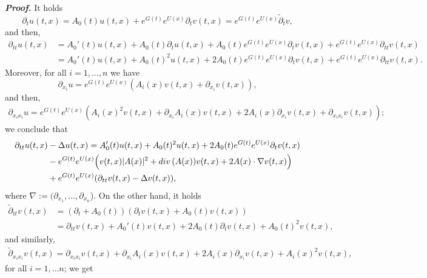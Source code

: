 \documentclass[10pt,a4paper]{amsart}
\renewcommand{\div}{\mathinner{\mathop{{\rm div}}}}
\renewenvironment{proof}{\smallskip\noindent\emph{\textbf{Proof.}}%
  \hspace{1pt}}{\hspace{-5pt}{\nobreak\quad\nobreak\hfill\nobreak%
    $\square$\vspace{2pt}\par}\smallskip\goodbreak}
\begin{document}
\begin{proof}
It holds 
%
\begin{equation*}
\partial_t u(t,x)=  A_0(t) u(t,x)+e^{G(t)} e^{U(x)} \partial_t v(t,x)=e^{G(t)} e^{U(x)} \tilde\partial_t v, 
\end{equation*}
%
and then,
\begin{align*}
\partial_{tt} u(t,x)&=  A_0'(t)u(t,x)+ A_0(t) \partial_t u(t,x)+ A_0(t)e^{G(t)} e^{U(x)} \partial_t v(t,x)+e^{G(t)} e^{U(x)}\partial_{tt}v(t,x)\\
%
&=  A_0'(t)u(t,x) +  A_0(t)^2 u(t,x)+2  A_0(t) e^{G(t)} e^{U(x)}  \partial_t v(t,x) +e^{G(t)} e^{U(x)}\partial_{tt}v(t,x).
\end{align*}
%
Moreover, for all $i=1, \dots, n$ we have
%
\begin{equation*}
\partial_{x_i} u= e^{G(t)}e^{U(x)}(A_i(x)v(t,x)+\partial_{x_i}v(t,x)),
\end{equation*}
%
and then,
\begin{align*}
\partial_{x_ix_i} u= e^{G(t)}e^{U(x)}(A_i(x)^2v(t,x)+\partial_{x_i} A_i(x)v(t,x)+2 A_i(x)\partial_{x_i}v(t,x)+\partial_{x_ix_i}v(t,x));
\end{align*}
%
we conclude that
%
\begin{equation}
\label{eq:wave_resolution*}
\begin{aligned}
\partial_{tt}u(t,x) &- \Delta u(t,x)=  A_0'(t)u(t,x) +  A_0(t)^2 u(t,x)+2  A_0(t) e^{G(t)}e^{U(x)} \partial_t v(t,x)\\& 
%
-e^{G(t)}e^{U(x)}\Big(v(t,x)| A(x)|^2+\div(A(x))v(t,x)+2  A(x)\cdot \nabla v(t,x)  \Big) \\
%
& +e^{G(t)} e^{U(x)}(\partial_{tt}v(t,x)-\Delta v(t,x)),
\end{aligned}
\end{equation}
where $\nabla:=(\partial_{x_1},\dots, \partial_{x_n}$).
%
On the other hand, it holds 
%
\begin{align*}
\tilde \partial_{tt}v(t,x)&=(\partial_t+ A_0(t))(\partial_t v(t,x)+ A_0(t)v(t,x))\\
%
& =\partial_{tt}v(t,x)+ A_0'(t)v(t,x)+2 A_0(t)\partial_t v(t,x)+ A_0(t)^2 v(t,x),
\end{align*}
%
and similarly, 
%
\begin{align*}
\tilde \partial_{x_i x_i}v(t,x)=\partial_{x_i x_i}v(t,x)+\partial_{x_i}A_i(x)v(t,x)+2A_i(x)\partial_{x_i}v(t,x)+ A_i(x)^2 v(t,x),
\end{align*}
%
for all $i=1,\dots n$; we get
%
\begin{equation*}
\begin{aligned}

\end{aligned}
\end{equation*}
\end{proof}
\end{document}
